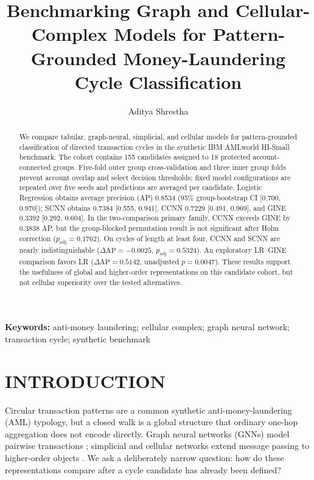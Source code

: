 \documentclass[12pt,a4paper]{article}
\title{Benchmarking Graph and Cellular-Complex Models for Pattern-Grounded Money-Laundering Cycle Classification}
\author{Aditya Shrestha}
\affil{Department of Computer Science and Engineering, Kathmandu University, Dhulikhel, Nepal\\
\texttt{adityashrestha39@gmail.com}}
\date{}
\def\candidateCount{155}\def\groupCount{18}\def\seedCount{5}\def\checkpointCount{200}
\def\lrAP{0.8534}\def\lrAPLo{0.700}\def\lrAPHi{0.970}\def\lrROC{0.9433}\def\lrFOne{0.7532}
\def\gineAP{0.3392}\def\gineAPLo{0.292}\def\gineAPHi{0.604}\def\gineROC{0.6591}\def\gineFOne{0.3529}
\def\scnnAP{0.7384}\def\scnnAPLo{0.555}\def\scnnAPHi{0.941}\def\scnnROC{0.9097}\def\scnnFOne{0.7160}
\def\ccnnAP{0.7229}\def\ccnnAPLo{0.491}\def\ccnnAPHi{0.969}\def\ccnnROC{0.9061}\def\ccnnFOne{0.7059}
\def\rqOneDelta{0.3838}\def\rqOneRawP{0.0881}\def\rqOneAdjP{0.1762}
\def\rqTwoDelta{-0.0025}\def\rqTwoRawP{0.5324}\def\rqTwoAdjP{0.5324}
\def\rqThreeDelta{0.5142}\def\rqThreeRawP{0.0047}
\begin{document}
\maketitle

\begin{abstract}
We compare tabular, graph-neural, simplicial, and cellular models for pattern-grounded classification of directed transaction cycles in the synthetic IBM AMLworld HI-Small benchmark. The cohort contains \candidateCount{} candidates assigned to \groupCount{} protected account-connected groups. Five-fold outer group cross-validation and three inner group folds prevent account overlap and select decision thresholds; fixed model configurations are repeated over five seeds and predictions are averaged per candidate. Logistic Regression obtains average precision (AP) \lrAP{} (95\% group-bootstrap CI [\lrAPLo{}, \lrAPHi{}]); SCNN obtains \scnnAP{} [\scnnAPLo{}, \scnnAPHi{}], CCNN \ccnnAP{} [\ccnnAPLo{}, \ccnnAPHi{}], and GINE \gineAP{} [\gineAPLo{}, \gineAPHi{}]. In the two-comparison primary family, CCNN exceeds GINE by \rqOneDelta{} AP, but the group-blocked permutation result is not significant after Holm correction ($p_{\mathrm{adj}}=\rqOneAdjP{}$). On cycles of length at least four, CCNN and SCNN are nearly indistinguishable ($\Delta\mathrm{AP}=\rqTwoDelta{}$, $p_{\mathrm{adj}}=\rqTwoAdjP{}$). An exploratory LR--GINE comparison favors LR ($\Delta\mathrm{AP}=\rqThreeDelta{}$, unadjusted $p=\rqThreeRawP{}$). These results support the usefulness of global and higher-order representations on this candidate cohort, but not cellular superiority over the tested alternatives.
\end{abstract}

\noindent\textbf{Keywords:} anti-money laundering; cellular complex; graph neural network; transaction cycle; synthetic benchmark

\section{INTRODUCTION}
Circular transaction patterns are a common synthetic anti-money-laundering (AML) typology, but a closed walk is a global structure that ordinary one-hop aggregation does not encode directly. Graph neural networks (GNNs) model pairwise transactions \cite{kipf2016semi,velickovic2018graph,hamilton2017inductive}; simplicial and cellular networks extend message passing to higher-order objects \cite{bodnar2021weisfeiler,bodnar2021cellular}. We ask a deliberately narrow question: how do these representations compare after a cycle candidate has already been defined?
\end{document}
